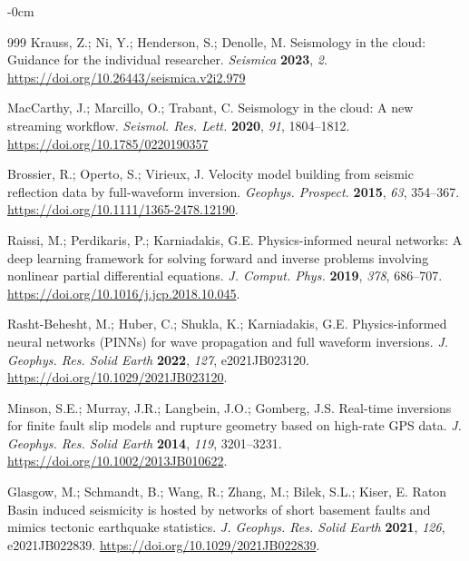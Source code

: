 \documentclass[data,article,accept,pdftex,moreauthors]{Definitions/mdpi}
\begin{document}
\begin{adjustwidth}{-\extralength}{0cm}
\begin{thebibliography}{999}
Krauss, Z.; Ni, Y.; Henderson, S.; Denolle, M. Seismology in the cloud: Guidance for the individual researcher. \emph{Seismica} \textbf{2023}, \emph{2}. \url{https://doi.org/10.26443/seismica.v2i2.979}

MacCarthy, J.; Marcillo, O.; Trabant, C. Seismology in the cloud: A new streaming workflow. \emph{Seismol. Res. Lett.} \textbf{2020}, \emph{91}, 1804--1812. \url{https://doi.org/10.1785/0220190357}

Brossier, R.; Operto, S.; Virieux, J. Velocity model building from seismic reflection data by full-waveform inversion. \emph{Geophys. Prospect.} \textbf{2015}, \emph{63}, 354--367. \url{https://doi.org/10.1111/1365-2478.12190}.

Raissi, M.; Perdikaris, P.; Karniadakis, G.E. Physics-informed neural networks: A deep learning framework for solving forward and inverse problems involving nonlinear partial differential equations. \emph{J. Comput. Phys.} \textbf{2019}, \emph{378}, 686--707. \url{https://doi.org/10.1016/j.jcp.2018.10.045}.

Rasht-Behesht, M.; Huber, C.; Shukla, K.; Karniadakis, G.E. Physics-informed neural networks (PINNs) for wave propagation and full waveform inversions. \emph{J. Geophys. Res. Solid Earth} \textbf{2022}, \emph{127}, e2021JB023120. \url{https://doi.org/10.1029/2021JB023120}.

Minson, S.E.; Murray, J.R.; Langbein, J.O.; Gomberg, J.S. Real-time inversions for finite fault slip models and rupture geometry based on high-rate GPS data. \emph{J. Geophys. Res. Solid Earth} \textbf{2014}, \emph{119}, 3201--3231. \url{https://doi.org/10.1002/2013JB010622}.

Glasgow, M.; Schmandt, B.; Wang, R.; Zhang, M.; Bilek, S.L.; Kiser, E. Raton Basin induced seismicity is hosted by networks of short basement faults and mimics tectonic earthquake statistics. \emph{J. Geophys. Res. Solid Earth} \textbf{2021}, \emph{126}, e2021JB022839. \url{https://doi.org/10.1029/2021JB022839}.


\end{thebibliography}
\end{adjustwidth}
\end{document}
